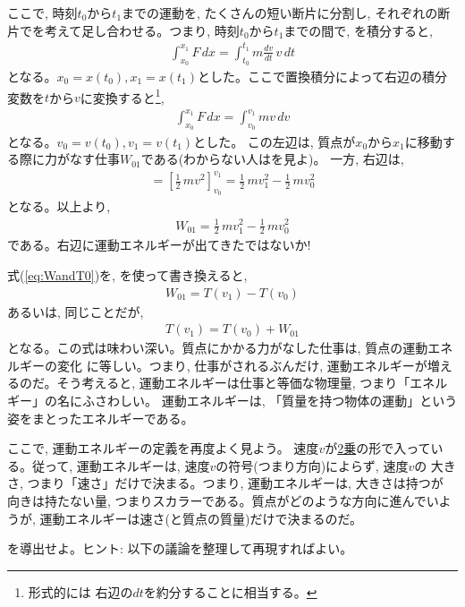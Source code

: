 ここで, 時刻$t_0$から$t_1$までの運動を, たくさんの短い断片に分割し, 
それぞれの断片でを考えて足し合わせる。つまり, 
時刻$t_0$から$t_1$までの間で, を積分すると, 
\begin{eqnarray} 
\int_{x_0}^{x_1}F\,dx=\int_{t_0}^{t_1}m\frac{dv}{dt}\,v\,dt\label{eq:WandT00s}
\end{eqnarray} 
となる。$x_0=x(t_0), x_1=x(t_1)$とした。ここで置換積分によって右辺の積分変数を$t$から$v$に変換すると\footnote{形式的には
右辺の$dt$を約分することに相当する。}, 
\begin{eqnarray} 
\int_{x_0}^{x_1}F\,dx=\int_{v_0}^{v_1}mv\,dv
\end{eqnarray} 
となる。$v_0=v(t_0), v_1=v(t_1)$とした。
この左辺は, 質点が$x_0$から$x_1$に移動する際に力がなす仕事$W_{01}$である(わからない人はを見よ)。
一方, 右辺は, 
\begin{eqnarray}=\left[\frac{1}{2}\,mv^2\right]_{v_0}^{v_1}=\frac{1}{2}\,mv_1^2-\frac{1}{2}\,mv_0^2\end{eqnarray}
となる。以上より, 
\begin{eqnarray} 
W_{01}=\frac{1}{2}\,mv_1^2-\frac{1}{2}\,mv_0^2\label{eq:WandT0}
\end{eqnarray} 
である。右辺に運動エネルギーが出てきたではないか!

式(\ref{eq:WandT0})を, を使って書き換えると, 
\begin{eqnarray} 
W_{01}=T(v_1)-T(v_0)\label{eq:WandT2}
\end{eqnarray} 
あるいは, 同じことだが, 
\begin{eqnarray} 
T(v_1)=T(v_0)+W_{01}\label{eq:TandW2}
\end{eqnarray} 
となる。この式は味わい深い。質点にかかる力がなした仕事は, 質点の運動エネルギーの変化
に等しい。つまり, 仕事がされるぶんだけ, 運動エネルギーが増えるのだ。そう考えると, 
運動エネルギーは仕事と等価な物理量, つまり「エネルギー」の名にふさわしい。
運動エネルギーは, 「質量を持つ物体の運動」という姿をまとったエネルギーである。\mv

ここで, 運動エネルギーの定義を再度よく見よう。
速度$v$が\underline{2乗}の形で入っている。従って, 運動エネルギーは, 速度$v$の符号(つまり方向)によらず, 速度$v$の
大きさ, つまり「速さ」だけで決まる。つまり, 運動エネルギーは, 大きさは持つが
向きは持たない量, つまりスカラーである。質点がどのような方向に進んでいようが, 
運動エネルギーは速さ(と質点の質量)だけで決まるのだ。\mv
%

\begin{q}\label{q:principle_energy} を導出せよ。ヒント: 
以下の議論を整理して再現すればよい。\end{q}


